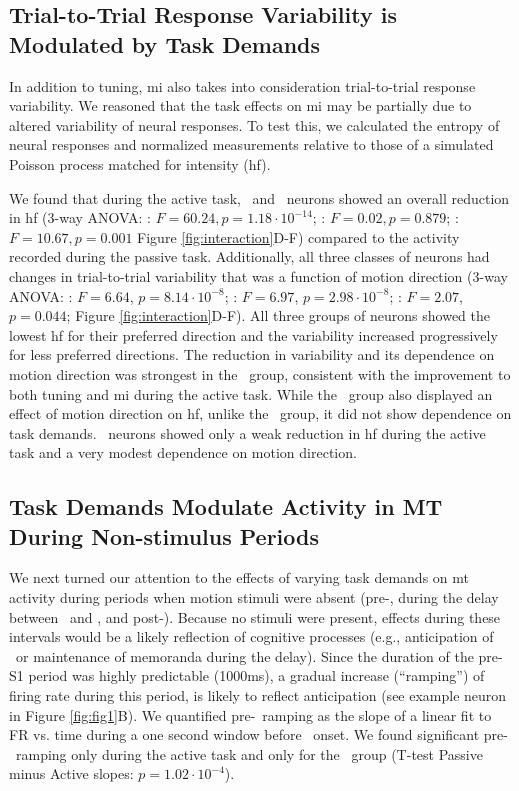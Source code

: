 \subsection*{Trial-to-Trial Response Variability is Modulated by Task Demands}
In addition to tuning, \gls{mi} also takes into consideration trial-to-trial response variability. We reasoned that the task effects on \gls{mi} may be partially due to altered variability of neural responses. To test this, we calculated the entropy of neural responses and normalized measurements relative to those of a simulated Poisson process matched for intensity (\gls{hf}).

We found that during the active task, \enhanced\ and \consistent\ neurons showed an overall reduction in \gls{hf} (3-way ANOVA: \enhanced: $F=60.24, p=1.18\cdot10^{-14}$; \suppressed: $F=0.02, p=0.879$; \consistent: $F=10.67, p=0.001$ Figure \ref{fig:interaction}D-F) compared to the activity recorded during the passive task. Additionally, all three classes of neurons had changes in trial-to-trial variability that was a function of motion direction (3-way ANOVA: \enhanced: $F=6.64$, $p=8.14\cdot10^{-8}$; \suppressed: $F=6.97$, $p=2.98\cdot10^{-8}$; \consistent: $F=2.07$, $p=0.044$; Figure \ref{fig:interaction}D-F). 
All three groups of neurons showed the lowest \gls{hf} for their preferred direction and the variability increased progressively for less preferred directions. The reduction in variability and its dependence on motion direction was strongest in the \enhanced\ group, consistent with the improvement to both tuning and \gls{mi} during the active task. While the \suppressed\ group also displayed an effect of motion direction on \gls{hf}, unlike the \enhanced\ group, it did not show dependence on task demands. \consistent\ neurons showed only a weak reduction in \gls{hf} during the active task and a very modest dependence on motion direction.

\subsection*{Task Demands Modulate Activity in MT During Non-stimulus Periods}
We next turned our attention to the effects of varying task demands on \gls{mt} activity during periods when motion stimuli were absent (pre-\sample, during the delay between \sample\ and \test, and post-\test). Because no stimuli were present, effects during these intervals would be a likely reflection of cognitive processes (e.g., anticipation of \sample\ or maintenance of memoranda during the delay). Since the duration of the pre-S1 period was highly predictable (1000ms), a gradual increase (``ramping'') of firing rate during this period, is likely to reflect anticipation (see example neuron in Figure \ref{fig:fig1}B). We quantified pre-\sample\ ramping as the slope of a linear fit to FR vs. time during a one second window before \sample\ onset. We found significant pre-\sample\ ramping only during the active task and only for the \enhanced\ group (T-test Passive minus Active slopes: $p=1.02\cdot 10^{-4}$).


